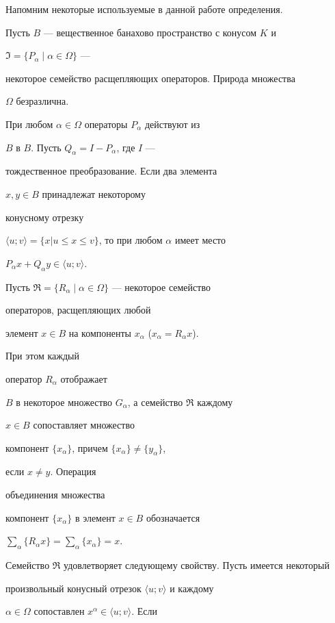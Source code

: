Напомним некоторые используемые в данной работе определения.





Пусть $B$ --- вещественное банахово пространство с конусом $K$ и


$\Im=\{P_\alpha\mid\alpha\in\Omega\}$ ---


некоторое семейство расщепляющих операторов. Природа множества


$\Omega$ безразлична.


При любом $\alpha\in\Omega$ операторы $P_\alpha$ действуют из


$B$ в $B$. Пусть $Q_\alpha=I-P_\alpha$, где $I$ ---


тождественное преобразование. Если два элемента


$x,y\in B$ принадлежат некоторому


конусному отрезку


$\langle u;v\rangle=\{x|u\le x\le v\}$, то при любом $\alpha$ имеет место


$P_\alpha x+Q_\alpha y\in\langle u;v\rangle$.





Пусть $\Re=\{R_\alpha\mid\alpha\in\Omega\}$ --- некоторое семейство


операторов, расщепляющих любой


элемент $x\in B$ на компоненты $x_\alpha$ ($x_\alpha=R_\alpha x$).


При этом каждый


оператор $R_\alpha$ отображает


$B$ в некоторое множество $G_\alpha$, а семейство $\Re$ каждому


$x\in B$ сопоставляет множество


компонент $\{x_\alpha\}$, причем $\{x_\alpha\}\ne\{y_\alpha\}$,


если $x\ne y$. Операция


объединения множества


компонент $\{x_\alpha\}$ в элемент $x\in B$ обозначается


$\sum\limits_\alpha\{R_\alpha x\}=\sum\limits_\alpha\{x_\alpha\}=x$.


Семейство $\Re$ удовлетворяет следующему свойству. Пусть имеется некоторый


произвольный конусный отрезок $\langle u;v\rangle$ и каждому


$\alpha\in\Omega$ сопоставлен $x^\alpha\in\langle u;v\rangle$. Если


